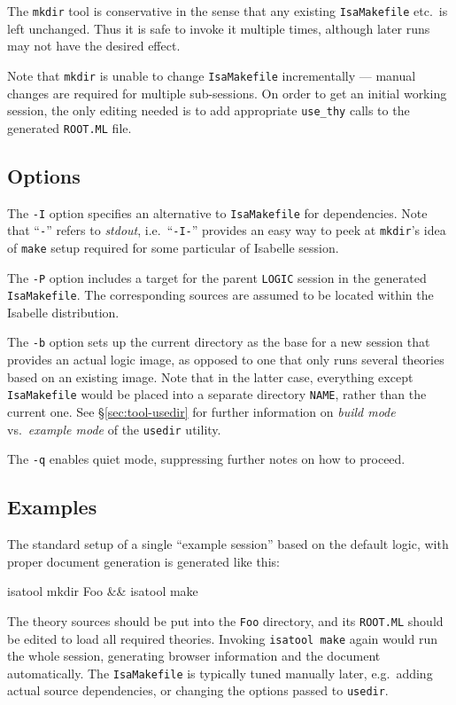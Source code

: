 The \texttt{mkdir} tool is conservative in the sense that any existing
\texttt{IsaMakefile} etc.\ is left unchanged.  Thus it is safe to invoke it
multiple times, although later runs may not have the desired effect.

Note that \texttt{mkdir} is unable to change \texttt{IsaMakefile}
incrementally --- manual changes are required for multiple sub-sessions.  On
order to get an initial working session, the only editing needed is to add
appropriate \texttt{use_thy} calls to the generated \texttt{ROOT.ML} file.


\subsection*{Options}

The \texttt{-I} option specifies an alternative to \texttt{IsaMakefile} for
dependencies.  Note that ``\texttt{-}'' refers to \emph{stdout}, i.e.\ 
``\texttt{-I-}'' provides an easy way to peek at \texttt{mkdir}'s idea of
\texttt{make} setup required for some particular of Isabelle session.

\medskip The \texttt{-P} option includes a target for the parent
\texttt{LOGIC} session in the generated \texttt{IsaMakefile}.  The
corresponding sources are assumed to be located within the Isabelle
distribution.

\medskip The \texttt{-b} option sets up the current directory as the base for
a new session that provides an actual logic image, as opposed to one that only
runs several theories based on an existing image.  Note that in the latter
case, everything except \texttt{IsaMakefile} would be placed into a separate
directory \texttt{NAME}, rather than the current one.  See
\S\ref{sec:tool-usedir} for further information on \emph{build mode} vs.\ 
\emph{example mode} of the \texttt{usedir} utility.

\medskip The \texttt{-q} enables quiet mode, suppressing further notes on how
to proceed.


\subsection*{Examples}

The standard setup of a single ``example session'' based on the default logic,
with proper document generation is generated like this:
\begin{ttbox}
isatool mkdir Foo && isatool make
\end{ttbox}
\noindent The theory sources should be put into the \texttt{Foo} directory, and its
\texttt{ROOT.ML} should be edited to load all required theories.  Invoking
\texttt{isatool make} again would run the whole session, generating browser
information and the document automatically.  The \texttt{IsaMakefile} is
typically tuned manually later, e.g.\ adding actual source dependencies, or
changing the options passed to \texttt{usedir}.

